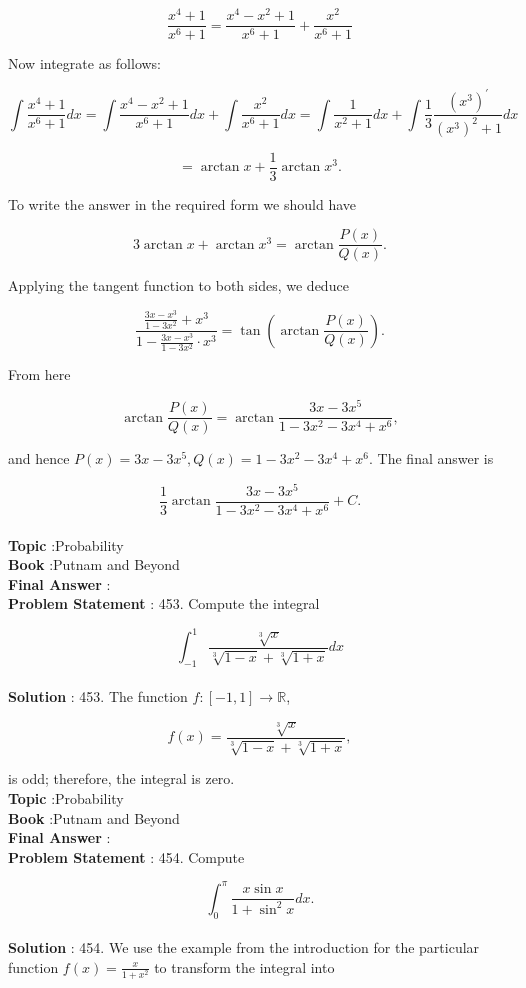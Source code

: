 \documentclass[10pt]{article}
\begin{document}
$$
\frac{x^{4}+1}{x^{6}+1}=\frac{x^{4}-x^{2}+1}{x^{6}+1}+\frac{x^{2}}{x^{6}+1}
$$

Now integrate as follows:

$$
\int \frac{x^{4}+1}{x^{6}+1} d x=\int \frac{x^{4}-x^{2}+1}{x^{6}+1} d x+\int \frac{x^{2}}{x^{6}+1} d x=\int \frac{1}{x^{2}+1} d x+\int \frac{1}{3} \frac{\left(x^{3}\right)^{\prime}}{\left(x^{3}\right)^{2}+1} d x
$$



$$
=\arctan x+\frac{1}{3} \arctan x^{3} .
$$

To write the answer in the required form we should have

$$
3 \arctan x+\arctan x^{3}=\arctan \frac{P(x)}{Q(x)} .
$$

Applying the tangent function to both sides, we deduce

$$
\frac{\frac{3 x-x^{3}}{1-3 x^{2}}+x^{3}}{1-\frac{3 x-x^{3}}{1-3 x^{2}} \cdot x^{3}}=\tan \left(\arctan \frac{P(x)}{Q(x)}\right) .
$$

From here

$$
\arctan \frac{P(x)}{Q(x)}=\arctan \frac{3 x-3 x^{5}}{1-3 x^{2}-3 x^{4}+x^{6}},
$$

and hence $P(x)=3 x-3 x^{5}, Q(x)=1-3 x^{2}-3 x^{4}+x^{6}$. The final answer is

$$
\frac{1}{3} \arctan \frac{3 x-3 x^{5}}{1-3 x^{2}-3 x^{4}+x^{6}}+C .
$$
\\
\textbf{Topic} :Probability\\
\textbf{Book} :Putnam and Beyond\\
\textbf{Final Answer} :\\


\textbf{Problem Statement} :
453. Compute the integral

$$
\int_{-1}^{1} \frac{\sqrt[3]{x}}{\sqrt[3]{1-x}+\sqrt[3]{1+x}} d x
$$
\\
\textbf{Solution} :
453. The function $f:[-1,1] \rightarrow \mathbb{R}$,

$$
f(x)=\frac{\sqrt[3]{x}}{\sqrt[3]{1-x}+\sqrt[3]{1+x}},
$$

is odd; therefore, the integral is zero.
\\
\textbf{Topic} :Probability\\
\textbf{Book} :Putnam and Beyond\\
\textbf{Final Answer} :\\


\textbf{Problem Statement} :
454. Compute

$$
\int_{0}^{\pi} \frac{x \sin x}{1+\sin ^{2} x} d x .
$$
\\
\textbf{Solution} :
454. We use the example from the introduction for the particular function $f(x)=\frac{x}{1+x^{2}}$ to transform the integral into
\end{document}
